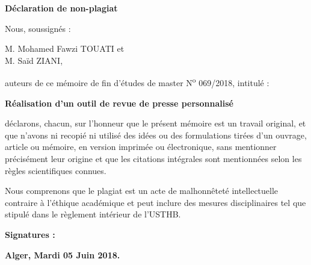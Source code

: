 \newpage
\vspace*{1.2cm}
\begin{center}
    \Large
    \textbf{Déclaration de non-plagiat}
\end{center}
\vspace*{2.5cm}
Nous, soussignés :
\vspace*{0.5cm}

M. Mohamed Fawzi TOUATI et\\
M. Saïd ZIANI,
\vspace*{1cm}

auteurs de ce mémoire de fin d'études de master N\textsuperscript{o} 069/2018, intitulé :
\begin{center}
\large
\textbf{
Réalisation d'un outil de revue de presse personnalisé
}
\end{center}
\vspace*{1.2cm}


déclarons, chacun, sur l'honneur que le présent mémoire est un travail original, et que n'avons ni recopié ni utilisé des idées ou des formulations tirées d'un ouvrage, article ou mémoire, en version imprimée ou électronique, sans mentionner précisément leur origine et que les citations intégrales sont mentionnées selon les règles scientifiques connues. 

Nous comprenons que le plagiat est un acte de malhonnêteté intellectuelle contraire à l'éthique académique et peut inclure des mesures disciplinaires tel que stipulé dans le règlement intérieur de l'USTHB.


\vspace*{3cm}
\textbf{Signatures :}



\vspace*{4cm}
\hspace*{8.5cm}
\textbf{Alger, Mardi 05 Juin 2018.}
